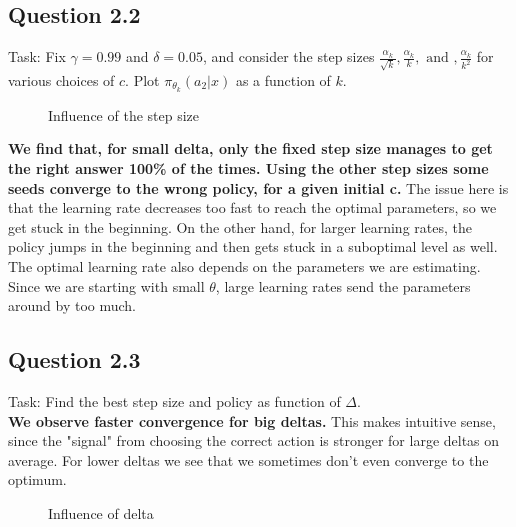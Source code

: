 \documentclass[a4paper, 11pt]{article} %
\begin{document}
\subsection*{Question 2.2}

Task: Fix $\gamma = 0.99$ and $\delta = 0.05$, and consider the step sizes $\frac{\alpha_{k}}{\sqrt{k}} ,\frac{\alpha_{k}}{k}, \text { and },\frac{\alpha_{k}}{k^{2}}$ for various choices of $c$. Plot $\pi_{\theta_{k}}(a_{2}|x)$ as a function of $k$. \\

   \begin{figure}[!htb]
        \caption{\label{fig:my-label} Influence of the step size}
      \end{figure}

\textbf{We find that, for small delta, only the fixed step size manages to get the right answer 100\% of the times. Using the other step sizes some seeds converge to the wrong policy, for a given initial c.} The issue here is that the learning rate decreases too fast to reach the optimal parameters, so we get stuck in the beginning. On the other hand, for larger learning rates, the policy jumps in the beginning and then gets stuck in a suboptimal level as well. \\

The optimal learning rate also depends on the parameters we are estimating. Since we are starting with small $\theta$, large learning rates send the parameters around by too much.

\subsection*{Question 2.3}

Task: Find the best step size and policy as function of $\Delta$. \\

\textbf{We observe faster convergence for big deltas.} This makes intuitive sense, since the "signal" from choosing the correct action is stronger for large deltas on average. For lower deltas we see that we sometimes don't even converge to the optimum.

   \begin{figure}[!htb]
        \caption{\label{fig:my-label} Influence of delta}
      \end{figure}
\end{document}
